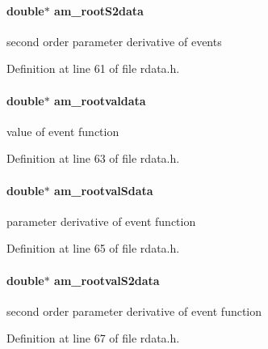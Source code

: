 \paragraph[{am\+\_\+root\+S2data}]{\setlength{\rightskip}{0pt plus 5cm}double$\ast$ am\+\_\+root\+S2data}\label{struct_return_data_a4d7116a416a12564e8058589889357ba}
second order parameter derivative of events 

Definition at line 61 of file rdata.\+h.

\hypertarget{struct_return_data_a4991fdb926d3db2f28c327165d0c11c4}{}
\paragraph[{am\+\_\+rootvaldata}]{\setlength{\rightskip}{0pt plus 5cm}double$\ast$ am\+\_\+rootvaldata}\label{struct_return_data_a4991fdb926d3db2f28c327165d0c11c4}
value of event function 

Definition at line 63 of file rdata.\+h.

\hypertarget{struct_return_data_adc0a319cb427b2ad2fef3f2cbd69d765}{}
\paragraph[{am\+\_\+rootval\+Sdata}]{\setlength{\rightskip}{0pt plus 5cm}double$\ast$ am\+\_\+rootval\+Sdata}\label{struct_return_data_adc0a319cb427b2ad2fef3f2cbd69d765}
parameter derivative of event function 

Definition at line 65 of file rdata.\+h.

\hypertarget{struct_return_data_a63a3d2f728c5789c4b93a84ecaf29cfa}{}
\paragraph[{am\+\_\+rootval\+S2data}]{\setlength{\rightskip}{0pt plus 5cm}double$\ast$ am\+\_\+rootval\+S2data}\label{struct_return_data_a63a3d2f728c5789c4b93a84ecaf29cfa}
second order parameter derivative of event function 

Definition at line 67 of file rdata.\+h.

